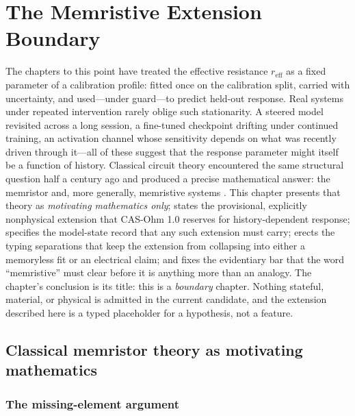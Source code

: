\chapter{The Memristive Extension Boundary}\label{mem:chapter}

The chapters to this point have treated the effective resistance $r_{\mathrm{eff}}$ as a fixed parameter of a calibration profile: fitted once on the calibration split, carried with uncertainty, and used---under guard---to predict held-out response. Real systems under repeated intervention rarely oblige such stationarity. A steered model revisited across a long session, a fine-tuned checkpoint drifting under continued training, an activation channel whose sensitivity depends on what was recently driven through it---all of these suggest that the response parameter might itself be a function of history. Classical circuit theory encountered the same structural question half a century ago and produced a precise mathematical answer: the memristor and, more generally, memristive systems \cite{chua71,chuakang76}. This chapter presents that theory as \emph{motivating mathematics only}; states the provisional, explicitly nonphysical extension that CAS-Ohm 1.0 reserves for history-dependent response; specifies the model-state record that any such extension must carry; erects the typing separations that keep the extension from collapsing into either a memoryless fit or an electrical claim; and fixes the evidentiary bar that the word ``memristive'' must clear before it is anything more than an analogy. The chapter's conclusion is its title: this is a \emph{boundary} chapter. Nothing stateful, material, or physical is admitted in the current candidate, and the extension described here is a typed placeholder for a hypothesis, not a feature.

\section{Classical memristor theory as motivating mathematics}\label{mem:sec:classical}

\subsection{The missing-element argument}\label{mem:sec:missing}

